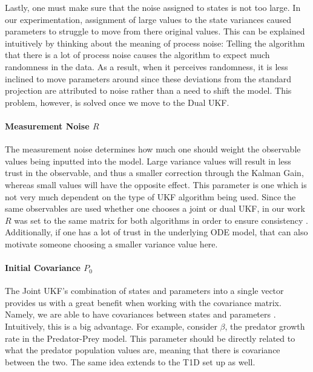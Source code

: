 Lastly, one must make sure that the noise assigned to states is not too large. In our experimentation, assignment of large values to the state variances caused parameters to struggle to move from there original values. This can be explained intuitively by thinking about the meaning of process noise: Telling the algorithm that there is a lot of process noise causes the algorithm to expect much randomness in the data. As a result, when it perceives randomness, it is less inclined to move parameters around since these deviations from the standard projection are attributed to noise rather than a need to shift the model. This problem, however, is solved once we move to the Dual UKF.

\paragraph{Measurement Noise $R$}
The measurement noise determines how much one should weight the observable values being inputted into the model. Large variance values will result in less trust in the observable, and thus a smaller correction through the Kalman Gain, whereas small values will have the opposite effect. This parameter is one which is not very much dependent on the type of UKF algorithm being used. Since the same observables are used whether one chooses a joint or dual UKF, in our work $R$ was set to the same matrix for both algorithms in order to ensure consistency \cite{GoveHollingerDual}. Additionally, if one has a lot of trust in the underlying ODE model, that can also motivate someone choosing a smaller variance value here. 

\paragraph{Initial Covariance $P_0$}
The Joint UKF's combination of states and parameters into a single vector provides us with a great benefit when working with the covariance matrix. Namely, we are able to have covariances between states and parameters \cite{GoveHollingerDual}. Intuitively, this is a big advantage. For example, consider $\beta$, the predator growth rate in the Predator-Prey model. This parameter should be directly related to what the predator population values are, meaning that there is covariance between the two. The same idea extends to the T1D set up as well.\\

